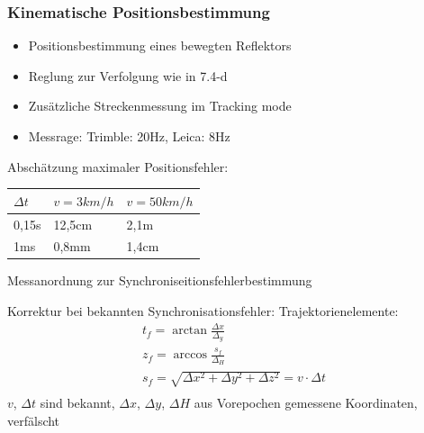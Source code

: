 \documentclass[12pt]{article}
\begin{document}
\subsubsection{Kinematische Positionsbestimmung}
\begin{itemize}
	\item Positionsbestimmung eines bewegten Reflektors
	\item Reglung zur Verfolgung wie in 7.4-d
	\item Zusätzliche Streckenmessung im Tracking mode
	\item Messrage: Trimble: 20Hz, Leica: 8Hz
\end{itemize}
Abschätzung maximaler Positionsfehler: \newline
\begin{table}[ht] \centering
	\begin{tabular}{|l|l|l|}
		\hline
		$\Delta t$ & $v = 3km/h$ & $v=50km/h$ \\ \hline
		0,15s      & 12,5cm      & 2,1m       \\ \hline
		1ms        & 0,8mm       & 1,4cm      \\ \hline
	\end{tabular}
\end{table}
Messanordnung zur Synchroniseitionsfehlerbestimmung \newline
\begin{figure}[ht]\centering
\end{figure}
Korrektur bei bekannten Synchronisationsfehler: \newline
Trajektorienelemente:
\begin{gather*}
	t_f = \arctan \frac{\Delta x}{\Delta_y} \\
	z_f = \arccos \frac{s_f}{\Delta_H} \\
	s_f = \sqrt{\Delta x^2 + \Delta y^2 + \Delta z^2} = v \cdot \Delta t \\
\end{gather*} 
$v$, $\Delta t$ sind bekannt, $\Delta x$, $\Delta y$, $\Delta H$ aus Vorepochen \newline
gemessene Koordinaten, verfälscht
\end{document}
